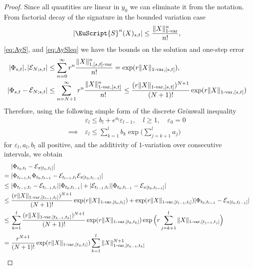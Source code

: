 \documentclass{article}
\newcommand{\var}[1]{{#1 \mathchar"2D \mathrm{var}}}
\def\eps{\varepsilon}
\def\Sig{\EuScript{S}}
\def\cE{\mathcal{E}}
\numberwithin{equation}{section}
\theoremstyle{definition}
\theoremstyle{remark}
\begin{document}
\begin{proof}
Since all quantities are linear in $y_0$ we can eliminate it from the notation. From factorial decay of the signature in the bounded variation case \cite[Proposition 2.2]{LCL}
\[
|\Sig^n(X)_{s,t}| \leq \frac{\|X\|_{\var{1}}^n}{n!},
\]
\eqref{eq:AyS}, and \eqref{eq:AySleq} we have the bounds on the solution and one-step error
\begin{align*}
|\Phi_{s,t}|, |\cE_{N;s,t}| &\leq \sum_{n = 0}^\infty r^n \frac{\|X\|_{\var{1,[s,t]}}^n}{n!} = \exp(r \|X\|_{\var{1},[s,t]} ),\\
|\Phi_{s,t} - \cE_{N;s,t}| &\leq \sum_{n = N+1}^\infty r^n \frac{\|X\|_{\var{1},[s,t]}^n}{n!} \leq \frac{(r \|X\|_{\var{1},[s,t]})^{N+1}}{(N+1)!} \exp(r \|X\|_{\var{1},[s,t]})
\end{align*}
Therefore, using the following simple form of the discrete Grönwall inequality
\begin{equation}\label{eq:discreteGronwall1}
\begin{split}
&\varepsilon_l \leq b_l + e^{a_l} \varepsilon_{l-1}, \quad l \geq 1, \quad \varepsilon_0 = 0 \\
\implies \ &\varepsilon_l \leq \sum_{k = 1}^l b_k \exp \Big( \sum_{j = k + 1}^l a_j \Big)
\end{split}
\end{equation}
for $\eps_l,a_l,b_l$ all positive, and the additivity of $1$-variation over consecutive intervals, we obtain
\begin{align*}
&|\Phi_{t_0,t_l} - \mathcal E_{\pi[t_0,t_l]}| \\
={}& |\Phi_{t_{l-1}, t_l} \Phi_{t_0,t_{l-1}} - \mathcal E_{t_{l-1},t_l} \mathcal E_{\pi[t_0,t_{l-1}]}|\\
\leq{}& |\Phi_{t_{l-1}, t_l} - \cE_{t_{l-1}, t_l}||\Phi_{t_0,t_{l-1}}| + |\mathcal E_{t_{l-1},t_l}| |\Phi_{t_0,t_{l-1}} - \mathcal E_{\pi[t_0,t_{l-1}]}| \\
\leq{}& \frac{(r \|X\|_{\var{1},[t_{l-1},t_l]})^{N+1}}{(N+1)!}\exp(r \|X\|_{\var{1},[t_0,t_l]}) + \exp(r \|X\|_{\var{1},[t_{l-1},t_l]})|\Phi_{t_0,t_{l-1}} - \mathcal E_{\pi[t_0,t_{l-1}]}| \\
\leq{} &\sum_{k = 1}^l \frac{(r \| X\|_{\var{1},[t_{k-1},t_k]})^{N+1}}{(N+1)!}\exp(r \| X\|_{\var{1},[t_0,t_k]}) \exp\Big(r \sum_{j = k+1}^l \| X\|_{\var{1},[t_{j-1},t_j]}\Big) \\
={}& \frac{r^{N+1}}{(N+1)!} \exp(r \| X \|_{\var{1},[t_0,t_l]}) \sum_{k = 1}^l \| X \|_{\var{1},[t_{k - 1}, t_k]}^{N+1}
\end{align*}


\end{proof}
\end{document}
